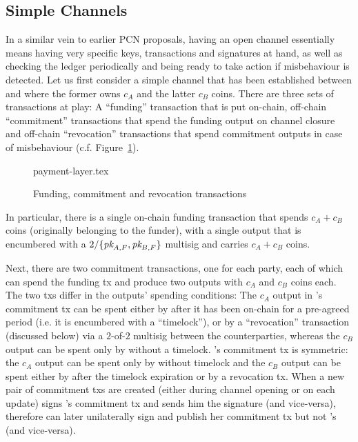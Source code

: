 \subsection{Simple Channels}
  In a similar vein to earlier PCN proposals, having an open channel essentially
  means having very specific keys, transactions and signatures at hand, as well
  as checking the ledger periodically and being ready to take action if
  misbehaviour is detected. Let us first consider a simple channel that has been
  established between \alice and \bob where the former owns $c_A$ and the latter
  $c_B$ coins. There are three sets of transactions at play: A ``funding''
  transaction that is put on-chain, off-chain ``commitment'' transactions that
  spend the funding output on channel closure and off-chain ``revocation''
  transactions that spend commitment outputs in case of misbehaviour (c.f.
  Figure~\ref{figure:payment-layer}).

  \begin{figure}
    {payment-layer.tex}
    \caption{Funding, commitment and revocation transactions}
    \label{figure:payment-layer}
  \end{figure}

  In particular, there is a single on-chain funding transaction that spends $c_A
  + c_B$ coins (originally belonging to the funder), with a single output that is encumbered with a
  $2/\{\textit{pk}_{A, F}, \textit{pk}_{B, F}\}$ multisig and carries $c_A + c_B$ coins.

  Next, there are two commitment transactions, one for each party, each of which can spend the
  funding tx and produce two outputs with $c_A$ and $c_B$ coins each. The two
  txs differ in the outputs' spending conditions: The $c_A$ output in \alice's
  commitment tx can be spent either by \alice after it has been on-chain for a
  pre-agreed period (i.e. it is encumbered with a ``timelock''), or by a
  ``revocation'' transaction (discussed below) via a $2$-of-$2$ multisig between
  the counterparties, whereas the $c_B$ output can be spent only by \bob without
  a timelock. \bob's commitment tx is symmetric: the $c_A$ output can be spent
  only by \alice without timelock and the $c_B$ output can be spent either by
  \bob after the timelock expiration or by a revocation tx. When a new pair of
  commitment txs are created (either during channel opening or on each update)
  \alice signs \bob's commitment tx and sends him the signature (and
  vice-versa), therefore \alice can later unilaterally sign and publish her commitment
  tx but not \bob's (and vice-versa).

